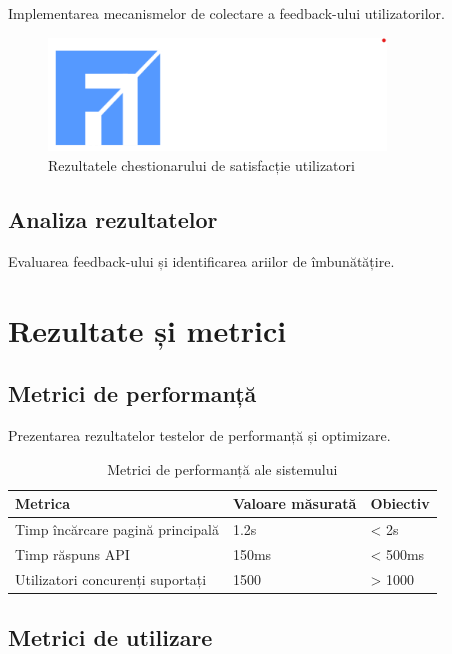 \documentclass[12pt,a4paper]{report}
\begin{document}
Implementarea mecanismelor de colectare a feedback-ului utilizatorilor.

\begin{figure}[H]
\centering
\includegraphics[width=0.8\textwidth]{logo_uaic.png}
\caption{Rezultatele chestionarului de satisfacție utilizatori}
\label{fig:user_satisfaction}
\end{figure}

\subsection{Analiza rezultatelor}

Evaluarea feedback-ului și identificarea ariilor de îmbunătățire.

\section{Rezultate și metrici}

\subsection{Metrici de performanță}

Prezentarea rezultatelor testelor de performanță și optimizare.

\begin{table}[H]
\centering
\caption{Metrici de performanță ale sistemului}
\label{tab:performance_metrics}
\begin{tabular}{|l|l|l|}
\hline
\textbf{Metrica} & \textbf{Valoare măsurată} & \textbf{Obiectiv} \\
\hline
Timp încărcare pagină principală & 1.2s & < 2s \\
\hline
Timp răspuns API & 150ms & < 500ms \\
\hline
Utilizatori concurenți suportați & 1500 & > 1000 \\
\hline
\end{tabular}
\end{table}

\subsection{Metrici de utilizare}
\end{document}

